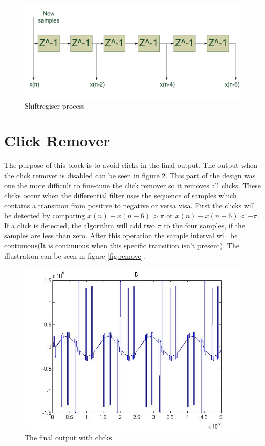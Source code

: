 \begin{figure}[h]
 \centering
 \includegraphics[scale=0.4]{images/shift.pdf}
 \caption{Shiftregiser process}
 \label{fig:shift}
\end{figure}

\section{Click Remover}
The purpose of this block is to avoid clicks in the final output. The output when the click remover is disabled can be seen in figure \ref{fig:clicks}. This part of the design was one the more difficult to fine-tune the click remover so it removes all clicks. These clicks occur when the differential filter uses the sequence of samples which contains a transition from positive to negative or versa visa. First the clicks will be detected by comparing $x(n) - x(n-6) > \pi$ or $x(n) - x(n-6) < -\pi$. If a click is detected, the algorithm will add two $\pi$ to the four samples, if the samples are less than zero. After this operation the sample interval will be continuous(It is continuous when this specific transition isn't present). The illustration can be seen in figure \ref{fig:remove}.

\begin{figure}[h]
 \centering
 \includegraphics[scale=0.4]{images/clicks.jpg}
 \caption{The final output with clicks}
 \label{fig:clicks}
\end{figure}

